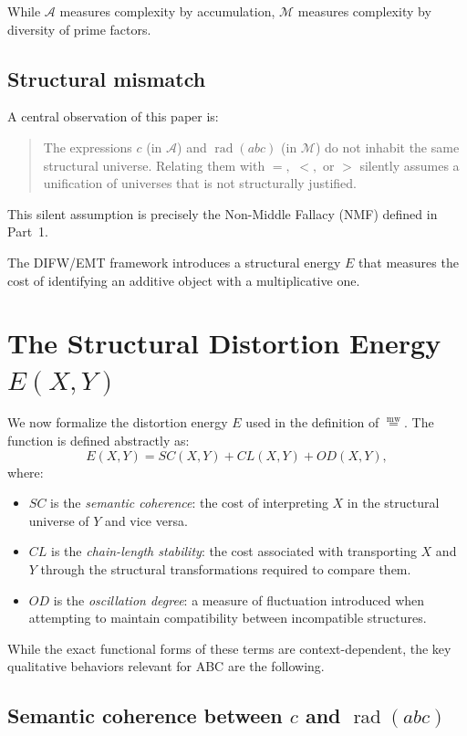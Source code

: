 \documentclass[11pt]{article}
\newcommand{\mweq}{\mathrel{\overset{\mathrm{mw}}{=}}}
\theoremstyle{definition}
\theoremstyle{remark}
\begin{document}
While $\mathcal{A}$ measures complexity by accumulation, $\mathcal{M}$
measures complexity by diversity of prime factors.

\subsection{Structural mismatch}

A central observation of this paper is:

\begin{quote}
The expressions $c$ (in $\mathcal{A}$) and $\operatorname{rad}(abc)$ (in $\mathcal{M}$)
do not inhabit the same structural universe. Relating them with $=,$ $<,$
or $>$ silently assumes a unification of universes that is not
structurally justified.
\end{quote}

This silent assumption is precisely the Non-Middle Fallacy (NMF) defined
in Part~1.

The DIFW/EMT framework introduces a structural energy $E$ that measures
the cost of identifying an additive object with a multiplicative one.

\section{The Structural Distortion Energy $E(X,Y)$}

We now formalize the distortion energy $E$ used in the definition of
$\mweq$. The function is defined abstractly as:
\[
  E(X,Y) = SC(X,Y) + CL(X,Y) + OD(X,Y),
\]
where:

\begin{itemize}
  \item $SC$ is the {\em semantic coherence}: the cost of interpreting
        $X$ in the structural universe of $Y$ and vice versa.
  \item $CL$ is the {\em chain-length stability}: the cost associated
        with transporting $X$ and $Y$ through the structural
        transformations required to compare them.
  \item $OD$ is the {\em oscillation degree}: a measure of fluctuation
        introduced when attempting to maintain compatibility between
        incompatible structures.
\end{itemize}

While the exact functional forms of these terms are context-dependent,
the key qualitative behaviors relevant for ABC are the following.

\subsection{Semantic coherence between $c$ and $\operatorname{rad}(abc)$}
\end{document}
